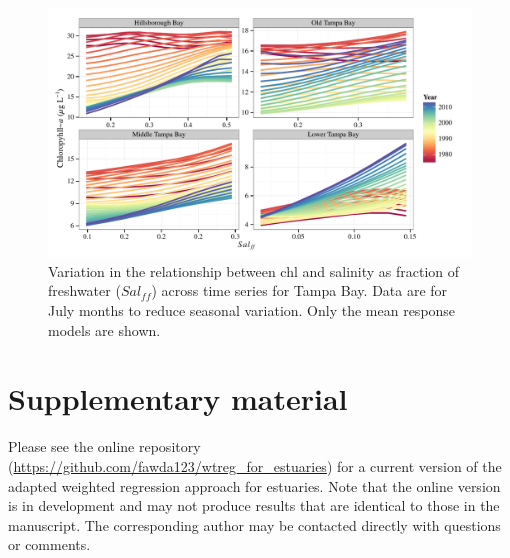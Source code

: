 \documentclass{svjour3}\usepackage[]{graphicx}\usepackage[]{color}
\begin{document}
\begin{figure}[!ht]


{\centering \includegraphics[width=6in]{figsdyna} 

}

\caption[Variation in the relationship between \ac{chl} and salinity as fraction of freshwater ($Sal_{ff}$) across time series for Tampa Bay]{Variation in the relationship between \ac{chl} and salinity as fraction of freshwater ($Sal_{ff}$) across time series for Tampa Bay. Data are for July months to reduce seasonal variation. Only the mean response models are shown.\label{fig:dyna}}
\end{figure}



\clearpage
\section{Supplementary material}

Please see the online repository (\href{https://github.com/fawda123/wtreg\_for\_estuaries}{https://github.com/fawda123/wtreg\_for\_estuaries}) for a current version of the adapted weighted regression approach for estuaries.  Note that the online version is in development and may not produce results that are identical to those in the manuscript. The corresponding author may be contacted directly with questions or comments.  
\end{document}

